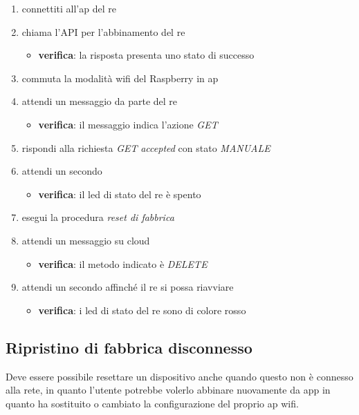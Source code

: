 \documentclass[12pt,a4paper,twoside,titlepage]{book}
\begin{document}
\begin{enumerate}
    \item connettiti all'\acrshort{ap} del \acrshort{re}
    \item chiama l'API per l'abbinamento del \acrshort{re} 
    \begin{itemize}
        \item \textbf{verifica}: la risposta presenta uno stato di successo 
    \end{itemize}
    \item commuta la modalità \Gls{wifi} del Raspberry in \acrshort{ap}
    \item attendi un messaggio da parte del \acrshort{re}
    \begin{itemize}
        \item \textbf{verifica}: il messaggio indica l'azione \textit{GET}
    \end{itemize}
    \item rispondi alla richiesta \textit{GET} \textit{accepted} con stato \textit{MANUALE}
    \item attendi un secondo 
    \begin{itemize}
        \item \textbf{verifica}: il \acrshort{led} di stato del \acrshort{re} è spento 
    \end{itemize}
    \item esegui la procedura \textit{reset di fabbrica}
    \item attendi un messaggio su cloud
    \begin{itemize}
        \item \textbf{verifica}: il metodo indicato è \textit{DELETE}
    \end{itemize}
    \item attendi un secondo affinché il \acrshort{re} si possa riavviare
    \begin{itemize}
        \item \textbf{verifica}: i  \acrshort{led} di stato del \acrshort{re} sono di colore rosso
    \end{itemize}
\end{enumerate}

\subsection{Ripristino di fabbrica disconnesso}
\label{section:test_factory_reset_offline}

Deve essere possibile resettare un dispositivo anche quando questo non è connesso
alla rete, in quanto l'utente potrebbe volerlo abbinare nuovamente da app in quanto ha sostituito
o cambiato la configurazione del proprio \acrshort{ap} \Gls{wifi}.
\end{document}
